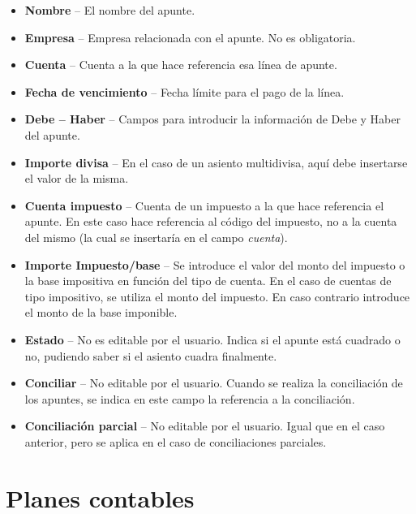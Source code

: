 \begin{itemize}

  \item \textbf{Nombre} -- El nombre del apunte.
  \item \textbf{Empresa} -- Empresa relacionada con el apunte. No es obligatoria.
  \item \textbf{Cuenta} -- Cuenta a la que hace referencia esa línea de apunte.
  \item \textbf{Fecha de vencimiento} -- Fecha límite para el pago de la línea.
  \item \textbf{Debe -- Haber} -- Campos para introducir la información de Debe y Haber del apunte.
  \item \textbf{Importe divisa} -- En el caso de un asiento multidivisa, aquí debe insertarse el valor de la misma.
  \item \textbf{Cuenta impuesto} -- Cuenta de un impuesto a la que hace referencia el apunte. En este caso hace referencia al código del impuesto, no a la cuenta del mismo (la cual se insertaría en el campo \emph{cuenta}).
  \item \textbf{Importe Impuesto/base} -- Se introduce el valor del monto del impuesto o la base impositiva en función del tipo de cuenta. En el caso de cuentas de tipo impositivo, se utiliza el monto del impuesto. En caso contrario introduce el monto de la base imponible.
  \item \textbf{Estado} -- No es editable por el usuario. Indica si el apunte está cuadrado o no, pudiendo saber si el asiento cuadra finalmente.
  \item \textbf{Conciliar} -- No editable por el usuario. Cuando se realiza la conciliación de los apuntes, se indica en este campo la referencia a la conciliación.
  \item \textbf{Conciliación parcial} -- No editable por el usuario. Igual que en el caso anterior, pero se aplica en el caso de conciliaciones parciales.
\end{itemize}









\section{Planes contables}

